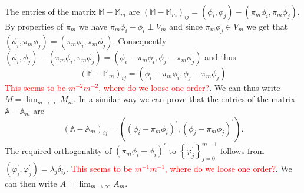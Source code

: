 \documentclass[a4paper,10pt]{article}
\newcommand{\inner}[2]{\ensuremath{\left(#1, #2\right)}}
\newcommand{\Amat}{\ensuremath{\mathbb{A}}}
\newcommand{\Mmat}{\ensuremath{\mathbb{M}}}
\newcommand{\Ammat}{\ensuremath{\mathbb{A}_m}}               %
\newcommand{\Mmmat}{\ensuremath{\mathbb{M}_m}}               %
\newcommand{\TODO}[1]{\textcolor{red}{#1}}
\begin{document}
  The entries of the matrix $\Mmat-\Mmmat$ are $\left(\Mmat-\Mmmat\right)_{ij}=
  \inner{\phi_i}{\phi_j}-\inner{\pi_m\phi_i}{\pi_m\phi_j}$. By properties of
  $\pi_m$ we have $\pi_m\phi_i - \phi_i \perp V_m$ and since $\pi_m\phi_j\in V_m$
  we get that $\inner{\phi_i}{\pi_m\phi_j}=\inner{\pi_m\phi_i}{\pi_m\phi_j}$.
  Consequently $\inner{\phi_i}{\phi_j}-\inner{\pi_m\phi_i}{\pi_m\phi_j} =
  \inner{\phi_i-\pi_m\phi_i}{\phi_j - \pi_m\phi_j}$ and thus
  \[
    \left(\Mmat-\Mmmat\right)_{ij} = \inner{\phi_i-\pi_m\phi_i}{\phi_j - \pi_m\phi_j}
  \]
  \TODO{This seems to be $m^{-2}m^{-2}$, where do we loose one order?}. We
  can thus write $M=\displaystyle\lim_{m\to\infty}M_m$.
  In a similar way we can prove that the entries of the matrix $\Amat-\Ammat$
  are
  \[
    \left(\Amat-\Ammat\right)_{ij} =
    \inner
    {\left(\phi_i-\pi_m\phi_i\right)^{\prime}}
    {\left(\phi_j - \pi_m\phi_j\right)^{\prime}}.
  \]
  The required orthogonality of $\left(\pi_m\phi_i - \phi_i\right)^{\prime}$ to
  $\left\{\varphi^{\prime}_j\right\}_{j=0}^{m-1}$ follows from  
  $\inner{\varphi_i^{\prime}}{\varphi_j^{\prime}}=\lambda_j\delta_{ij}$.
  \TODO{This seems to be $m^{-1}m^{-1}$, where do we loose one order?}. We
  can then write $A=\displaystyle\lim_{m\to\infty}A_m$.
\end{document}
